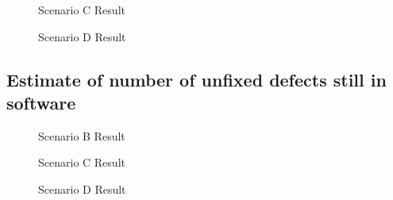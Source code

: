 \documentclass[a4paper,10pt]{article}
\begin{document}
\begin{appendices}
  \begin{figure}[!htb]
    \centering
    
    \caption{Scenario C Result}
  \end{figure}
  
  \begin{figure}[!htb]
    \centering
    
    \caption{Scenario D Result}
  \end{figure}
  
  \clearpage
  \subsection{Estimate of number of unfixed defects still in software}
  \begin{figure}[!htb]
    \centering
    
    \caption{Scenario B Result}
  \end{figure}
  
  \begin{figure}[!htb]
    \centering
    
    \caption{Scenario C Result}
  \end{figure}
  
  \begin{figure}[!htb]
    \centering
    
    \caption{Scenario D Result}
  \end{figure}

  
\end{appendices}
\end{document}

